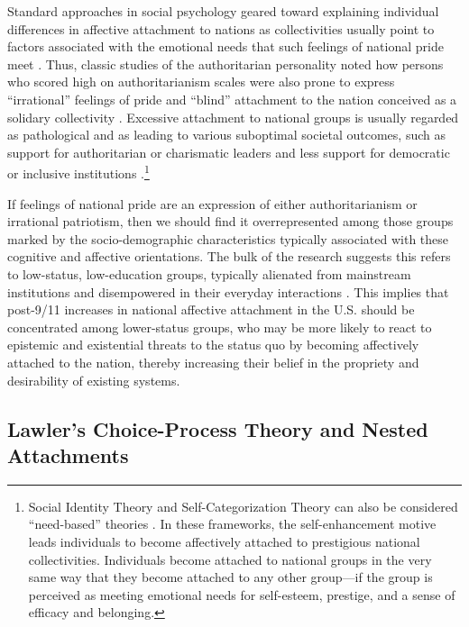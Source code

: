 \documentclass[12pt,letterpaper]{article}
\begin{document}
Standard approaches in social psychology geared toward explaining individual differences in affective attachment to nations as collectivities usually point to factors associated with the emotional needs that such feelings of national pride meet \citep{jost2007are-871}. Thus, classic studies of the authoritarian personality noted how persons who scored high on authoritarianism scales were also prone to express ``irrational'' feelings of pride and ``blind'' attachment to the nation conceived as a solidary collectivity \citep{adorno1950authoritarian-a52, pettigrew1999placing}. Excessive attachment to national groups is usually regarded as pathological and as leading to various suboptimal societal outcomes, such as support for authoritarian or charismatic leaders and less support for democratic or inclusive institutions \citep{santos2024liberal-conservative-a61}.\footnote{Social Identity Theory and Self-Categorization Theory can also be considered ``need-based'' theories \citep{hogg2000social-e0d}. In these frameworks, the self-enhancement motive leads individuals to become affectively attached to prestigious national collectivities. Individuals become attached to national groups in the very same way that they become attached to any other group---if the group is perceived as meeting emotional needs for self-esteem, prestige, and a sense of efficacy and belonging. } 

If feelings of national pride are an expression of either authoritarianism or irrational patriotism, then we should find it overrepresented among those groups marked by the socio-demographic characteristics typically associated with these cognitive and affective orientations. The bulk of the research suggests this refers to low-status, low-education groups, typically alienated from mainstream institutions and disempowered in their everyday interactions \citep{collins1986weberian, jost2017working-608, jost2003social-206}. This implies that post-9/11 increases in national affective attachment in the U.S. should be concentrated among lower-status groups, who may be more likely to react to epistemic and existential threats to the status quo by becoming affectively attached to the nation, thereby increasing their belief in the propriety and desirability of existing systems.

\subsection{Lawler's Choice-Process Theory and Nested Attachments}
\end{document}
